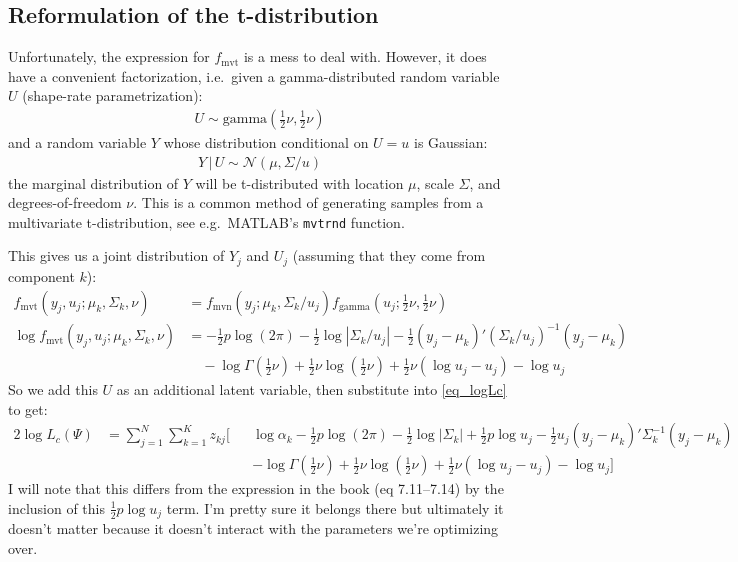 \documentclass[11pt]{article}
\begin{document}
\subsection{Reformulation of the t-distribution}

Unfortunately, the expression for $f_{\mathrm{mvt}}$ is a mess to deal with. However, it does have a convenient factorization, i.e.\ given a gamma-distributed random variable $U$ (shape-rate parametrization):
\begin{align*}
	U \sim \mathrm{gamma}( \frac12 \nu, \frac12 \nu )
\end{align*}
and a random variable $Y$ whose distribution conditional on $U=u$ is Gaussian:
\begin{align*}
	Y\, |\, U \sim \mathcal{N}( \mu, \Sigma / u)
\end{align*}
the marginal distribution of $Y$ will be t-distributed with location $\mu$, scale $\Sigma$, and degrees-of-freedom $\nu$. This is a common method of generating samples from a multivariate t-distribution, see e.g.\ MATLAB's \lstinline{mvtrnd} function.

This gives us a joint distribution of $Y_j$ and $U_j$ (assuming that they come from component $k$):
\begin{align*}
	f_{\mathrm{mvt}}(y_j , u_j ; \mu_k, \Sigma_k, \nu)
	&= f_{\mathrm{mvn}}(y_j ; \mu_k, \Sigma_k / u_j) f_{\mathrm{gamma}}( u_j ; \frac12\nu, \frac12\nu) \\
	\log f_{\mathrm{mvt}}(y_j , u_j ; \mu_k, \Sigma_k, \nu)
	&= -\frac12 p \log (2\pi) - \frac12 \log |\Sigma_k/u_j| - \frac12 (y_j - \mu_k)' (\Sigma_k/u_j)^{-1}(y_j-\mu_k) \\
	&\quad - \log\Gamma(\frac12\nu) + \frac12\nu \log(\frac12\nu) + \frac12\nu(\log u_j - u_j) - \log u_j
\end{align*}
So we add this $U$ as an additional latent variable, then substitute into \eqref{eq_logLc} to get:
\begin{alignat}{2}
	\log L_c( \Psi) &= \sum_{j=1}^N \sum_{k=1}^K  z_{kj} \bigg[ 
		&&\log \alpha_k -\frac12 p \log(2\pi) -\frac12 \log |\Sigma_k| + \frac12 p \log u_j - \frac12 u_j (y_j - \mu_k)' \Sigma_k^{-1} (y_j - \mu_k) \nonumber \\
		&& &- \log\Gamma(\frac12\nu) + \frac12\nu \log(\frac12\nu) + \frac12\nu(\log u_j - u_j) - \log u_j \bigg] 
	\label{eq_logLc_with_u}
\end{alignat}
I will note that this differs from the expression in the book (eq 7.11--7.14) by the inclusion of this $\frac12 p \log u_j$ term. I'm pretty sure it belongs there but ultimately it doesn't matter because it doesn't interact with the parameters we're optimizing over.
\end{document}
